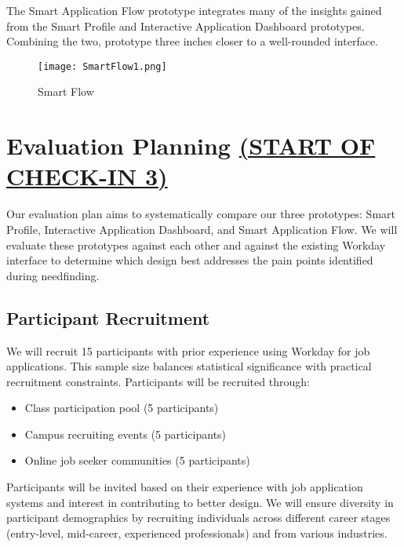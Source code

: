 \documentclass[
	letterpaper, %
]{jdf}
\begin{document}
\begin{sloppypar}
The Smart Application Flow prototype integrates many of the insights gained from the Smart Profile and Interactive Application Dashboard prototypes. Combining the two, prototype three inches closer to a well-rounded interface. 

\begin{figure}
    \centering
    \texttt{[image: SmartFlow1.png]}
    \caption{Smart Flow}
    \label{fig:enter-label}
\end{figure}




















\newpage


\section{Evaluation Planning \underline{(START OF CHECK-IN 3)}}
Our evaluation plan aims to systematically compare our three prototypes: Smart Profile, Interactive Application Dashboard, and Smart Application Flow. We will evaluate these prototypes against each other and against the existing Workday interface to determine which design best addresses the pain points identified during needfinding.

\subsection{Participant Recruitment}

We will recruit 15 participants with prior experience using Workday for job applications. This sample size balances statistical significance with practical recruitment constraints. Participants will be recruited through:

\begin{itemize}
    \item Class participation pool (5 participants)
    \item Campus recruiting events (5 participants)
    \item Online job seeker communities (5 participants)
\end{itemize}

Participants will be invited based on their experience with job application systems and interest in contributing to better design. We will ensure diversity in participant demographics by recruiting individuals across different career stages (entry-level, mid-career, experienced professionals) and from various industries.


\end{sloppypar}
\end{document}
